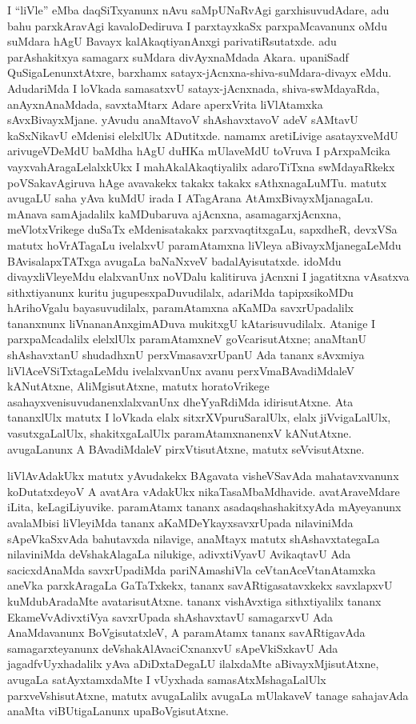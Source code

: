 I ``liVle'' eMba daqSiTxyanunx nAvu saMpUNaRvAgi garxhisuvudAdare, adu bahu parxkAravAgi kavaloDediruva I parxtayxkaSx parxpaMcavanunx oMdu suMdara hAgU Bavayx kalAkaqtiyanAnxgi parivatiRsutatxde. adu parAshakitxya samagarx suMdara divAyxnaMdada Akara. upaniSadf QuSigaLenunxtAtxre, barxhamx satayx-jAcnxna-shiva-suMdara-divayx eMdu. AdudariMda I loVkada samasatxvU satayx-jAcnxnada, shiva-swMdayaRda, anAyxnAnaMdada, savxtaMtarx Adare aperxVrita liVlAtamxka sAvxBivayxMjane. yAvudu anaMtavoV shAshavxtavoV adeV sAMtavU kaSxNikavU eMdenisi elelxlUlx ADutitxde. namamx aretiLivige asatayxveMdU arivugeVDeMdU baMdha hAgU duHKa mUlaveMdU toVruva I pArxpaMcika vayxvahAragaLelalxkUkx I mahAkalAkaqtiyalilx adaroTiTxna swMdayaRkekx poVSakavAgiruva hAge avavakekx takakx takakx sAthxnagaLuMTu. matutx avugaLU saha yAva kuMdU irada I ATagArana AtAmxBivayxMjanagaLu. mAnava samAjadalilx kaMDubaruva ajAcnxna, asamagarxjAcnxna, meVlotxVrikege duSaTx eMdenisatakakx parxvaqtitxgaLu, sapxdheR, devxVSa matutx hoVrATagaLu ivelalxvU paramAtamxna liVleya aBivayxMjanegaLeMdu BAvisalapxTATxga avugaLa baNaNxveV badalAyisutatxde. idoMdu divayxliVleyeMdu elalxvanUnx noVDalu kalitiruva jAcnxni I jagatitxna vAsatxva sithxtiyanunx kuritu jugupesxpaDuvudilalx, adariMda tapipxsikoMDu hArihoVgalu bayasuvudilalx, paramAtamxna aKaMDa savxrUpadalilx tananxnunx liVnananAnxgimADuva mukitxgU kAtarisuvudilalx. Atanige I parxpaMcadalilx elelxlUlx paramAtamxneV goVcarisutAtxne; anaMtanU shAshavxtanU shudadhxnU perxVmasavxrUpanU Ada tananx sAvxmiya liVlAceVSiTxtagaLeMdu ivelalxvanUnx avanu perxVmaBAvadiMdaleV kANutAtxne, AliMgisutAtxne, matutx horatoVrikege asahayxvenisuvudanenxlalxvanUnx dheYyaRdiMda idirisutAtxne. Ata tananxlUlx matutx I loVkada elalx sitxrXVpuruSaralUlx, elalx jiVvigaLalUlx, vasutxgaLalUlx, shakitxgaLalUlx paramAtamxnanenxV kANutAtxne. avugaLanunx A BAvadiMdaleV pirxVtisutAtxne, matutx seVvisutAtxne.

liVlAvAdakUkx matutx yAvudakekx BAgavata visheVSavAda mahatavxvanunx koDu\-tatxdeyoV A avatAra vAdakUkx nikaTasaMbaMdhavide. avatAraveMdare iLita, keLagiLiyuvike. paramAtamx tananx asadaqshashakitxyAda mAyeyanunx avalaMbisi liVleyiMda tananx aKaMDeYkayxsavxrUpada nilaviniMda sApeVkaSxvAda bahutavxda nilavige, anaMtayx matutx shAshavxtategaLa nilaviniMda deVshakAlagaLa nilukige, adivxtiVyavU AvikaqtavU Ada sacicxdAnaMda savxrUpadiMda pariNAmashiVla ceVtanAceVtanAtamxka aneVka parxkAragaLa GaTaTxkekx, tananx savARtigasatavxkekx savxlapxvU kuMdubAradaMte avatarisutAtxne. tananx vishAvxtiga sithxtiyalilx tananx EkameVvAdivxtiVya savxrUpada shAshavxtavU samagarxvU Ada AnaMdavanunx BoVgisutatxleV, A paramAtamx tananx savARtigavAda samagarxteyanunx deVshakAlAvaciCxnanxvU sApeVkiSxkavU Ada jagadfvUyxhadalilx yAva aDiDxtaDegaLU ilalxdaMte aBivayxMjisutAtxne, avugaLa satAyxtamxdaMte I vUyxhada samasAtxMshagaLalUlx parxveVshisutAtxne, matutx avugaLalilx avugaLa mUlakaveV tanage sahajavAda anaMta viBUtigaLanunx upaBoVgisutAtxne.

